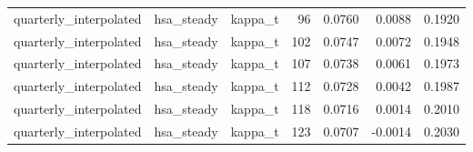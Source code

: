 \begin{tabular}{lllrrrr}
quarterly\_interpolated & hsa\_steady & kappa\_t & 96 & 0.0760 & 0.0088 & 0.1920 \\
quarterly\_interpolated & hsa\_steady & kappa\_t & 102 & 0.0747 & 0.0072 & 0.1948 \\
quarterly\_interpolated & hsa\_steady & kappa\_t & 107 & 0.0738 & 0.0061 & 0.1973 \\
quarterly\_interpolated & hsa\_steady & kappa\_t & 112 & 0.0728 & 0.0042 & 0.1987 \\
quarterly\_interpolated & hsa\_steady & kappa\_t & 118 & 0.0716 & 0.0014 & 0.2010 \\
quarterly\_interpolated & hsa\_steady & kappa\_t & 123 & 0.0707 & -0.0014 & 0.2030 \\
\bottomrule
\end{tabular}
